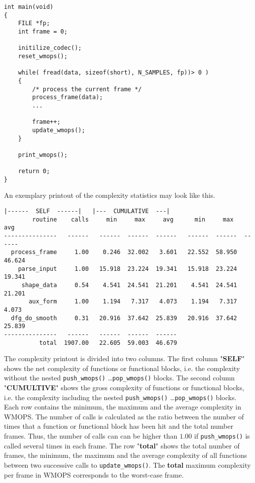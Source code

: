 \begin{Verbatim}[fontsize=\small]
int main(void)
{
    FILE *fp;
    int frame = 0;
    
    initilize_codec();
    reset_wmops();

    while( fread(data, sizeof(short), N_SAMPLES, fp))> 0 )
    {
        /* process the current frame */
        process_frame(data);
        ...
        
        frame++;
        update_wmops();
    }
    
    print_wmops();
    
    return 0;
}
\end{Verbatim}

An exemplary printout of the complexity statistics may look like this.

\begin{Verbatim}[fontsize=\small]
                           |------  SELF  ------|   |---  CUMULATIVE  ---|
        routine    calls     min     max     avg      min     max     avg
---------------   ------   ------  ------  ------   ------  ------  ------
  process_frame     1.00    0.246  32.002   3.601   22.552  58.950  46.624
    parse_input     1.00   15.918  23.224  19.341   15.918  23.224  19.341
     shape_data     0.54    4.541  24.541  21.201    4.541  24.541  21.201
       aux_form     1.00    1.194   7.317   4.073    1.194   7.317   4.073
  dfg_do_smooth     0.31   20.916  37.642  25.839   20.916  37.642  25.839
---------------   ------   ------  ------  ------
          total  1907.00   22.605  59.003  46.679
\end{Verbatim}

The complexity printout is divided into two columns. The first column "\textbf{SELF}" shows the net complexity of functions or functional blocks, i.e. the complexity without the nested \verb|push_wmops()| \ldots \verb|pop_wmops()|  blocks. The second column  "\textbf{CUMULTIVE}" shows the gross complexity of functions or functional blocks, i.e. the complexity including the nested \verb|push_wmops()| \ldots \verb|pop_wmops()|  blocks. Each row contains the minimum, the maximum and the average complexity in WMOPS. The number of calls is calculated as the ratio between the number of times that a function or functional block has been hit and the total number frames. Thus, the number of calls can can be higher than \(1.00\) if \verb|push_wmops()| is called several times in each frame. The row "\textbf{total}" shows the total number of frames, the minimum, the maximum and the average complexity of all functions between two successive calls to \verb|update_wmops()|. The \textbf{total} maximum complexity per frame in WMOPS corresponds to the worst-case frame. 

